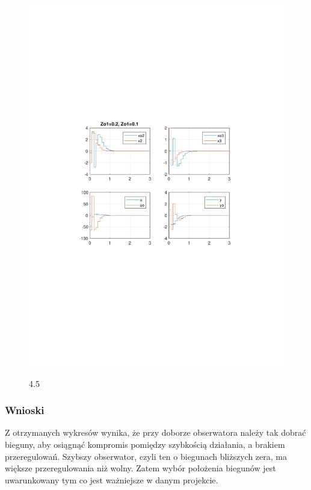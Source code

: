 \documentclass{article}
\begin{document}
\begin{figure}[H]
\includegraphics[clip, trim=2cm 10cm 2cm 9.5cm, width=1.00\textwidth]{../rys/zad4_rys5.pdf}
\label{fig:rys4.5}
\caption{4.5}
\end{figure}
\newpage
\subsubsection{Wnioski}
Z otrzymanych wykresów wynika, że przy doborze obserwatora należy tak dobrać bieguny, aby osiągnąć kompromis pomiędzy szybkością działania, a brakiem przeregulowań. Szybszy obserwator, czyli ten o biegunach bliższych zera, ma większe przeregulowania niż wolny.
Zatem wybór położenia biegunów jest uwarunkowany tym co jest ważniejsze w danym projekcie.
\end{document}
